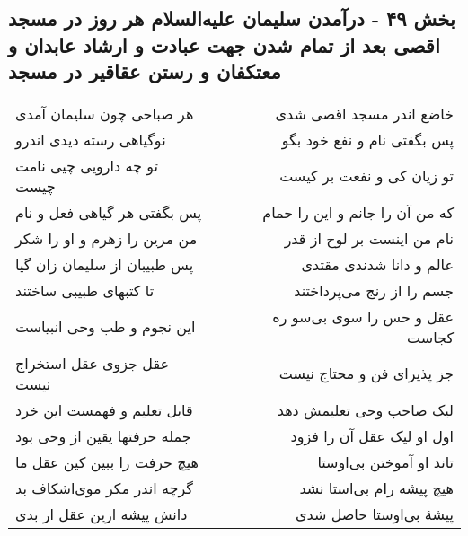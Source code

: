 \begin{center}
\section*{بخش ۴۹ - درآمدن سلیمان علیه‌السلام هر روز در مسجد اقصی بعد از تمام شدن جهت عبادت و ارشاد عابدان و معتکفان و  رستن عقاقیر در مسجد}
\label{sec:sh049}
\begin{longtable}{l p{0.5cm} r}
هر صباحی چون سلیمان آمدی
&&
خاضع اندر مسجد اقصی شدی
\\
نوگیاهی رسته دیدی اندرو
&&
پس بگفتی نام و نفع خود بگو
\\
تو چه دارویی چیی نامت چیست
&&
تو زیان کی و نفعت بر کیست
\\
پس بگفتی هر گیاهی فعل و نام
&&
که من آن را جانم و این را حمام
\\
من مرین را زهرم و او را شکر
&&
نام من اینست بر لوح از قدر
\\
پس طبیبان از سلیمان زان گیا
&&
عالم و دانا شدندی مقتدی
\\
تا کتبهای طبیبی ساختند
&&
جسم را از رنج می‌پرداختند
\\
این نجوم و طب وحی انبیاست
&&
عقل و حس را سوی بی‌سو ره کجاست
\\
عقل جزوی عقل استخراج نیست
&&
جز پذیرای فن و محتاج نیست
\\
قابل تعلیم و فهمست این خرد
&&
لیک صاحب وحی تعلیمش دهد
\\
جمله حرفتها یقین از وحی بود
&&
اول او لیک عقل آن را فزود
\\
هیچ حرفت را ببین کین عقل ما
&&
تاند او آموختن بی‌اوستا
\\
گرچه اندر مکر موی‌اشکاف بد
&&
هیچ پیشه رام بی‌استا نشد
\\
دانش پیشه ازین عقل ار بدی
&&
پیشهٔ بی‌اوستا حاصل شدی
\\
\end{longtable}
\end{center}
